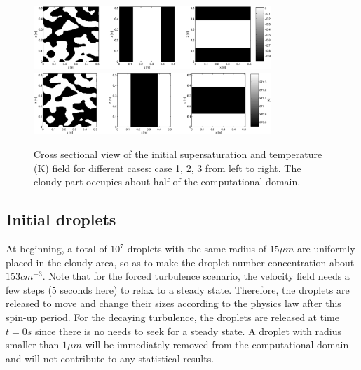 \begin{figure}\centering
\includegraphics[width=0.8\textwidth]{Figures/supersat_case123}\\
\includegraphics[width=0.8\textwidth]{Figures/temp_case123}
\caption{Cross sectional view of the initial supersaturation and temperature (K) field for different cases: case 1, 2, 3 from left to right. The cloudy part occupies about half of the computational domain.\label{fig:slice_case123}}
\end{figure}

\subsection{Initial droplets}
At beginning, a total of $10^{7}$ droplets with the same radius of $15\mu m$
are uniformly placed in the cloudy area, so as to make the droplet number
concentration about $153{cm}^{-3}$. Note that for the forced turbulence
scenario, the velocity field needs a few steps ($5$ seconds here) to relax to a
steady state. Therefore, the droplets are released to move and change their
sizes according to the physics law after this spin-up period. For the decaying
turbulence, the droplets are released at time $t = 0s$ since there is no needs
to seek for a steady state. A droplet with radius smaller than $1\mu m$ will be
immediately removed from the computational domain and will not contribute to
any statistical results.

